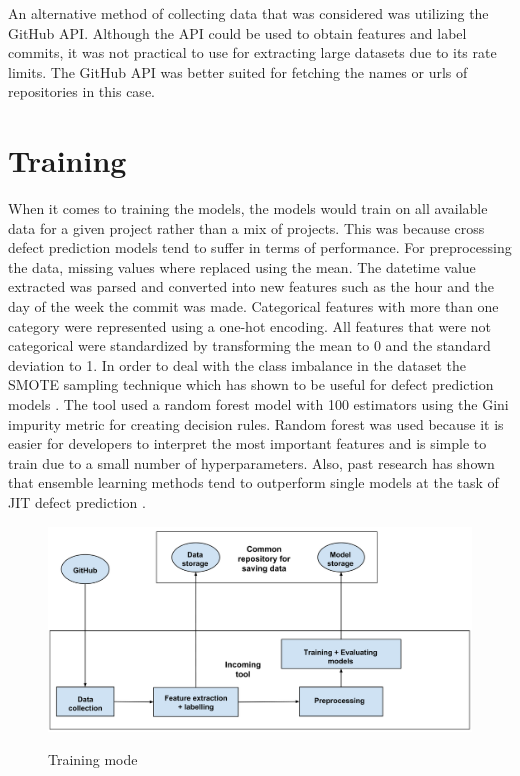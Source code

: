 \documentclass[../main.tex]{subfiles}
\begin{document}
An alternative method of collecting data that was considered was utilizing the GitHub API. Although the API could be used to obtain features and label commits, it was not practical to use for extracting large datasets due to its rate limits. The GitHub API was better suited for fetching the names or urls of repositories in this case. 

\section{Training}

When it comes to training the models, the models would train on all available data for a given project rather than a mix of projects. This was because cross defect prediction models tend to suffer in terms of performance. \cite{kamei2016studying} For preprocessing the data, missing values where replaced using the mean. The datetime value extracted was parsed and converted into new features such as the hour and the day of the week the commit was made. Categorical features with more than one category were represented using a one-hot encoding. All features that were not categorical were standardized by transforming the mean to 0 and the standard deviation to 1. In order to deal with the class imbalance in the dataset the SMOTE sampling technique which has shown to be useful for defect prediction models \cite{tan2015online}. The tool used a random forest model with 100 estimators using the Gini impurity metric for creating decision rules. Random forest was used because it is easier for developers to interpret the most important features and is simple to train due to a small number of hyperparameters. Also, past research has shown that ensemble learning methods tend to outperform single models at the task of JIT defect prediction \cite{yang2017tlel}. 

\vspace{10pt}

\begin{figure}[h]
\centering
\includegraphics[width=1\textwidth]{images/Technical_Contribution/incoming_1.png}
\label{fig:incoming1}
\caption{Training mode}
\end{figure}
\end{document}
